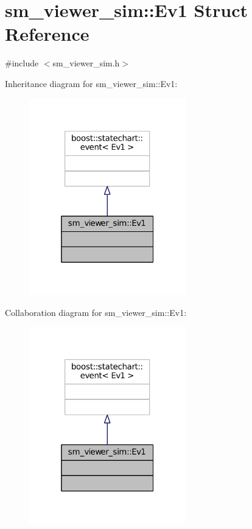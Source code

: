 \hypertarget{structsm__viewer__sim_1_1Ev1}{}\section{sm\+\_\+viewer\+\_\+sim\+:\+:Ev1 Struct Reference}
\label{structsm__viewer__sim_1_1Ev1}


{\ttfamily \#include $<$sm\+\_\+viewer\+\_\+sim.\+h$>$}



Inheritance diagram for sm\+\_\+viewer\+\_\+sim\+:\+:Ev1\+:
\nopagebreak
\begin{figure}[H]
\begin{center}
\leavevmode
\includegraphics[width=193pt]{structsm__viewer__sim_1_1Ev1__inherit__graph}
\end{center}
\end{figure}


Collaboration diagram for sm\+\_\+viewer\+\_\+sim\+:\+:Ev1\+:
\nopagebreak
\begin{figure}[H]
\begin{center}
\leavevmode
\includegraphics[width=193pt]{structsm__viewer__sim_1_1Ev1__coll__graph}
\end{center}
\end{figure}


